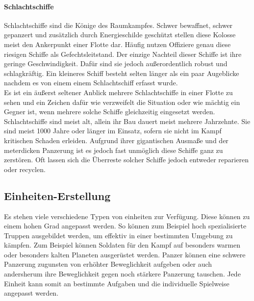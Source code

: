 \documentclass[11pt, a4paper]{article}
\begin{document}
\paragraph{Schlachtschiffe}
Schlachtschiffe sind die Könige des Raumkampfes. Schwer bewaffnet, schwer gepanzert und zusätzlich durch 
Energieschilde geschützt stellen diese Kolosse meist den Ankerpunkt einer Flotte dar. Häufig nutzen Offiziere
genau diese riesigen Schiffe als Gefechtsleitstand. Der einzige Nachteil dieser Schiffe ist ihre geringe
Geschwindigkeit. Dafür sind sie jedoch außerordentlich robust und schlagkräftig. Ein kleineres Schiff besteht 
selten länger als ein paar Augeblicke nachdem es von einem einem Schlachtschiff erfasst wurde.\\
Es ist ein äußerst seltener Anblick mehrere Schlachtschiffe in einer Flotte zu sehen und ein Zeichen dafür wie
verzweifelt die Situation oder wie mächtig ein Gegner ist, wenn mehrere solche Schiffe gleichzeitig eingesetzt
werden. Schlachtschiffe sind meist alt, allein ihr Bau dauert meist mehrere Jahrzehnte. Sie sind meist 1000
Jahre oder länger im Einsatz, sofern sie nicht im Kampf kritischen Schaden erleiden. Aufgrund ihrer 
gigantischen Ausmaße und der meterdicken Panzerung ist es jedoch fast unmöglich diese Schiffe ganz zu 
zerstören. Oft lassen sich die Überreste solcher Schiffe jedoch entweder reparieren oder recyclen.
%
\subsection{Einheiten-Erstellung}
Es stehen viele verschiedene Typen von einheiten zur Verfügung. Diese können zu einem hohen Grad angepasst
werden. So können zum Beispiel hoch spezialisierte Truppen ausgebildet werden, um effektiv in einer bestimmten
Umgebung zu kämpfen. Zum Beispiel können Soldaten für den Kampf auf besonders warmen oder besonders kalten 
Planeten ausgerüstet werden. Panzer können eine schwere Panzerung zugunsten von erhöhter Beweglichkeit 
aufgeben oder auch andersherum ihre Beweglichkeit gegen noch stärkere Panzerung tauschen. Jede Einheit kann
somit an bestimmte Aufgaben und die individuelle Spielweise angepasst werden.
%
\end{document}
